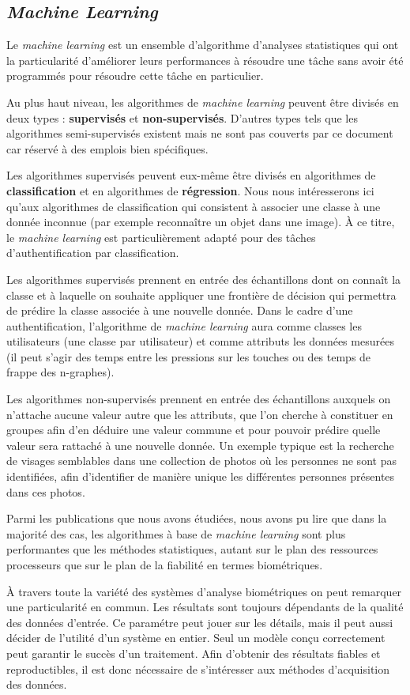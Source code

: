 \subsection{\textit{Machine Learning}}

Le \textit{machine learning} est un ensemble d'algorithme d'analyses statistiques qui ont la particularité d'améliorer leurs performances à résoudre une tâche sans avoir été programmés pour résoudre cette tâche en particulier.

Au plus haut niveau, les algorithmes de \textit{machine learning} peuvent être divisés en deux types : \textbf{supervisés} et \textbf{non-supervisés}. D'autres types tels que les algorithmes semi-supervisés existent mais ne sont pas couverts par ce document car réservé à des emplois bien spécifiques.

Les algorithmes supervisés peuvent eux-même être divisés en algorithmes de \textbf{classification} et en algorithmes de \textbf{régression}. Nous nous intéresserons ici qu'aux algorithmes de classification qui consistent à associer une classe à une donnée inconnue (par exemple reconnaître un objet dans une image). À ce titre, le \textit{machine learning} est particulièrement adapté pour des tâches d'authentification par classification.

Les algorithmes supervisés prennent en entrée des échantillons dont on connaît la classe et à laquelle on souhaite appliquer une frontière de décision qui permettra de prédire la classe associée à une nouvelle donnée. Dans le cadre d'une authentification, l'algorithme de \textit{machine learning} aura comme classes les utilisateurs (une classe par utilisateur) et comme attributs les données mesurées (il peut s'agir des temps entre les pressions sur les touches\cite{giotGREYC} ou des temps de frappe des n-graphes\cite{Hu2008,bergadano2002,gunetti2005}).

Les algorithmes non-supervisés prennent en entrée des échantillons auxquels on n'attache aucune valeur autre que les attributs, que l'on cherche à constituer en groupes afin d'en déduire une valeur commune et pour pouvoir prédire quelle valeur sera rattaché à une nouvelle donnée. Un exemple typique est la recherche de visages semblables dans une collection de photos où les personnes ne sont pas identifiées, afin d'identifier de manière unique les différentes personnes présentes dans ces photos.

Parmi les publications que nous avons étudiées, nous avons pu lire que dans la majorité des cas, les algorithmes à base de \textit{machine learning} sont plus performantes que les méthodes statistiques, autant sur le plan des ressources processeurs\cite{Hu2008} que sur le plan de la fiabilité en termes biométriques\cite{giotBenchmark}.

À travers toute la variété des systèmes d'analyse biométriques on peut remarquer une particularité en commun. Les résultats sont toujours dépendants de la qualité des données d'entrée. Ce paramétre peut jouer sur les détails, mais il peut aussi décider de l'utilité d'un système en entier. Seul un modèle conçu correctement peut garantir le succès d'un traitement. Afin d'obtenir des résultats fiables et reproductibles, il est donc nécessaire de s'intéresser aux méthodes d'acquisition des données.
